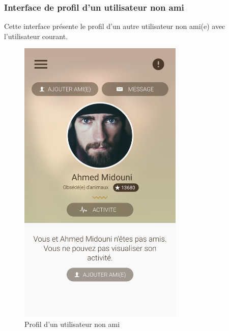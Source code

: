 \documentclass[11pt,a4paper,oneside]{book}
\begin{document}
					\subsubsection{Interface de profil d'un utilisateur non ami}
					Cette interface présente le profil d'un autre utilisateur non ami(e) avec l'utilisateur courant.
					\begin{figure}[H]
						\centering
						\includegraphics[width=0.7\textwidth]{../Maquettes/Hanimo-maquettes/Output/05-View-User-No-Friend}
						\caption{Profil d'un utilisateur non ami}
						\label{fig:05-view-user-no-friend}
					\end{figure}
				\vfill
				
\end{document}
